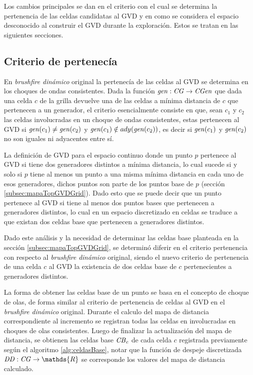 Los cambios principales se dan en el criterio con el cual se determina la
pertenencia de las celdas candidatas al GVD y en como se considera el espacio
desconocido al construir el GVD durante la exploración. Estos se tratan en las
siguientes secciones.

\subsection{Criterio de pertenecía}\label{subsec:critPer}

En \emph{brushfire dinámico} original la pertenecía de las celdas al GVD se
determina en los choques de ondas consistentes. Dada la función $\mathit{gen} :
\mathit{CG} \rightarrow \mathit{CGen}$ que dada una celda $c$ de la grilla devuelve
una de las celdas a mínima distancia de $c$ que pertenecen a un generador, el
criterio esencialmente consiste en que, sean $c_1$ y $c_2$ las celdas
involucradas en un choque de ondas consistentes, estas pertenecen al GVD si
$\mathit{gen}(c_1) \neq \mathit{gen}(c_2)$ y $\mathit{gen}(c_1) \notin
ady(\mathit{gen}(c_2))$, es decir si $\mathit{gen}(c_1)$ y $\mathit{gen}(c_2)$ no son
iguales ni adyacentes entre sí. 

La definición de GVD para el espacio continuo donde un punto $p$ pertenece al
GVD si tiene dos generadores distintos a mínima distancia, lo cual sucede si y solo si
$p$ tiene al menos un punto a una misma mínima distancia en cada uno de esos generadores,
dichos puntos son parte de los puntos base de $p$ (sección
\ref{subsec:mapaTopGVDGrid}). Dado esto que se puede decir que un punto pertenece
al GVD si tiene al menos dos puntos bases que pertenecen a generadores
distintos, lo cual en un espacio discretizado en celdas se traduce a que
existan dos celdas base que pertenecen a generadores distintos.

Dado este análisis y la necesidad de determinar las celdas base planteada en la
sección \ref{subsec:mapaTopGVDGrid}, se determinó diferir en el criterio
pertenencia con respecto al \emph{brushfire dinámico} original, siendo el nuevo
criterio de pertenencia de una celda $c$ al GVD la existencia de dos celdas
base de $c$ pertenecientes a generadores distintos.

La forma de obtener las celdas base de un punto se basa en el concepto de
choque de olas, de forma similar al criterio de pertenencia de celdas al GVD en
el \emph{brushfire dinámico} original. Durante el calculo del mapa de distancia
correspondiente al incremento se registran todas las celdas en involucradas en
choques de olas consistentes. Luego de finalizar la actualización del mapa de
distancia, se obtienen las celdas base $\mathit{CB}_c$ de cada celda $c$
registrada previamente según el algoritmo \ref{alg:celdasBase}, notar que la
función de despeje discretizada $\mli{DD} : \mli{CG} \rightarrow \mathds{R}$ se
corresponde los valores del mapa de distancia calculado.

